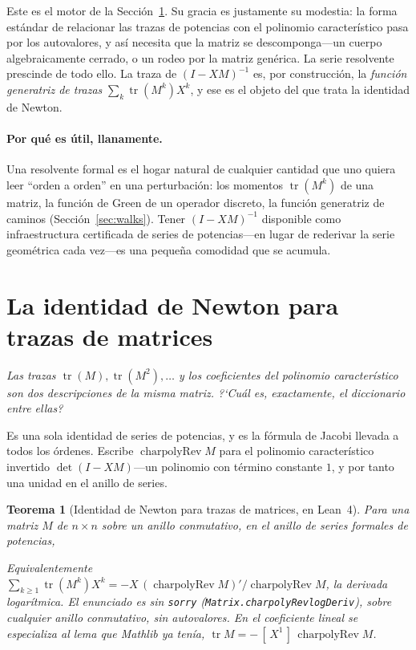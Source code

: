 \documentclass[11pt]{article}
\newtheorem{theorem}{Teorema}
\newcommand{\lean}[1]{{\def\_{\textunderscore\allowbreak}\texttt{#1}}}
\newcommand{\tr}{\operatorname{tr}}
\DeclareMathOperator{\charpolyRev}{charpolyRev}
\newcommand{\keyeq}[1]{\begin{center}\keybox{$\displaystyle #1$}\end{center}}
\begin{document}
Este es el motor de la Secci\'on~\ref{sec:newton}. Su gracia es justamente su modestia: la forma
est\'andar de relacionar las trazas de potencias con el polinomio caracter\'istico pasa por los
autovalores, y as\'i necesita que la matriz se descomponga---un cuerpo algebraicamente cerrado, o un
rodeo por la matriz gen\'erica. La serie resolvente prescinde de todo ello. La traza de $(I-XM)^{-1}$
es, por construcci\'on, la \emph{funci\'on generatriz de trazas} $\sum_k\tr(M^k)X^k$, y ese es el
objeto del que trata la identidad de Newton.

\paragraph{Por qu\'e es \'util, llanamente.}
Una resolvente formal es el hogar natural de cualquier cantidad que uno quiera leer ``orden a orden''
en una perturbaci\'on: los momentos $\tr(M^k)$ de una matriz, la funci\'on de Green de un operador
discreto, la funci\'on generatriz de caminos (Secci\'on~\ref{sec:walks}). Tener $(I-XM)^{-1}$
disponible como infraestructura certificada de series de potencias---en lugar de rederivar la serie
geom\'etrica cada vez---es una peque\~na comodidad que se acumula.

\section{La identidad de Newton para trazas de matrices}
\label{sec:newton}

\emph{Las trazas $\tr(M),\tr(M^2),\dots$ y los coeficientes del polinomio caracter\'istico son dos
descripciones de la misma matriz. ?`Cu\'al es, exactamente, el diccionario entre ellas?}

Es una sola identidad de series de potencias, y es la f\'ormula de Jacobi llevada a todos los
\'ordenes. Escribe $\charpolyRev M$ para el polinomio caracter\'istico invertido $\det(I-XM)$---un
polinomio con t\'ermino constante $1$, y por tanto una unidad en el anillo de series.

\begin{theorem}[Identidad de Newton para trazas de matrices, en Lean~4]
\label{thm:newton}
Para una matriz $M$ de $n\times n$ sobre un anillo conmutativo, en el anillo de series formales de
potencias,
\keyeq{(\charpolyRev M)'\;=\;-\,\charpolyRev M\cdot\sum_{k\ge0}\tr(M^{k+1})\,X^k.}
Equivalentemente $\sum_{k\ge1}\tr(M^k)X^k=-X\,(\charpolyRev M)'/\charpolyRev M$, la derivada
logar\'itmica. El enunciado es sin \lean{sorry} (\lean{Matrix.charpolyRev\_logDeriv}), sobre cualquier
anillo conmutativo, sin autovalores. En el coeficiente lineal se especializa al lema que Mathlib ya
ten\'ia, $\tr M=-\,[\,X^1\,]\,\charpolyRev M$.
\end{theorem}
\end{document}
